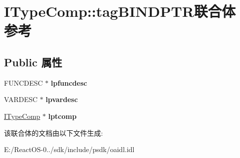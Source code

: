 \hypertarget{union_i_type_comp_1_1tag_b_i_n_d_p_t_r}{}\section{I\+Type\+Comp\+:\+:tag\+B\+I\+N\+D\+P\+T\+R联合体 参考}
\label{union_i_type_comp_1_1tag_b_i_n_d_p_t_r}
\subsection*{Public 属性}
\begin{DoxyCompactItemize}
\item 
\mbox{\label{union_i_type_comp_1_1tag_b_i_n_d_p_t_r_af97c6320c12d840d9085c63758b34401}} 
F\+U\+N\+C\+D\+E\+SC $\ast$ {\bfseries lpfuncdesc}
\item 
\mbox{\label{union_i_type_comp_1_1tag_b_i_n_d_p_t_r_a7fae754c674c132e50737795be152b34}} 
V\+A\+R\+D\+E\+SC $\ast$ {\bfseries lpvardesc}
\item 
\mbox{\label{union_i_type_comp_1_1tag_b_i_n_d_p_t_r_a7003c24757ca0b24a8177b00fc17241c}} 
\hyperlink{interface_i_type_comp}{I\+Type\+Comp} $\ast$ {\bfseries lptcomp}
\end{DoxyCompactItemize}


该联合体的文档由以下文件生成\+:\begin{DoxyCompactItemize}
\item 
E\+:/\+React\+O\+S-\/0../sdk/include/psdk/oaidl.\+idl\end{DoxyCompactItemize}
